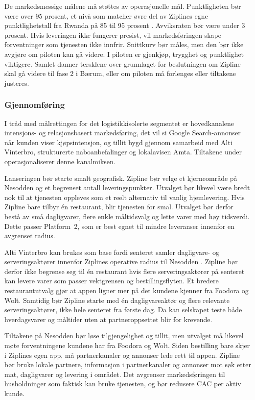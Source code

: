 De markedsmessige målene må støttes av operasjonelle mål. Punktligheten bør
være over 95 prosent, et nivå som matcher øvre del av Ziplines egne
punktlighetstall fra Rwanda på 85 til 95 prosent
\parencite{logisticsnavigators2026}. Avviksraten bør være under 3 prosent.
Hvis leveringen ikke fungerer presist, vil markedsføringen skape
forventninger som tjenesten ikke innfrir. Snittkurv bør måles, men den bør
ikke avgjøre om piloten kan gå videre. I piloten er gjenkjøp, trygghet og
punktlighet viktigere. Samlet danner tersklene over grunnlaget for
beslutningen om Zipline skal gå videre til fase 2 i Bærum, eller om
piloten må forlenges eller tiltakene justeres.

\subsubsection{Gjennomføring}

I tråd med målrettingen for det logistikkisolerte segmentet er
hovedkanalene intensjons- og relasjonsbasert markedsføring, det vil si
Google Search-annonser når kunden viser kjøpsintensjon, og tillit bygd
gjennom samarbeid med Alti Vinterbro, strukturerte naboanbefalinger og
lokalavisen Amta. Tiltakene under operasjonaliserer denne kanalmiksen.

Lanseringen bør starte smalt geografisk. Zipline bør velge et kjerneområde på
Nesodden og et begrenset antall leveringspunkter. Utvalget bør likevel være
bredt nok til at tjenesten oppleves som et reelt alternativ til vanlig
hjemlevering. Hvis Zipline bare tilbyr én restaurant, blir tjenesten for smal.
Utvalget bør derfor bestå av små dagligvarer, flere enkle måltidsvalg og lette
varer med høy tidsverdi. Dette passer Platform~2, som er best egnet til mindre
leveranser innenfor en avgrenset radius.

Alti Vinterbro kan brukes som base fordi senteret samler dagligvare- og
serveringsaktører innenfor Ziplines operative radius til Nesodden
\parencite{altivinterbro}. Zipline bør derfor ikke begrense seg til én
restaurant hvis flere serveringsaktører på senteret kan levere varer som
passer vektgrensen og bestillingsflyten. Et bredere restaurantutvalg gjør at
appen ligner mer på det kundene kjenner fra Foodora og Wolt. Samtidig bør
Zipline starte med én dagligvareaktør og flere relevante serveringsaktører,
ikke hele senteret fra første dag. Da kan selskapet teste både hverdagsvarer
og måltider uten at partneroppsettet blir for krevende.

Tiltakene på Nesodden bør løse tilgjengelighet og tillit, men utvalget må
likevel møte forventningene kundene har fra Foodora og Wolt. Siden bestilling
bare skjer i Ziplines egen app, må partnerkanaler og annonser lede rett til
appen. Zipline bør bruke lokale partnere, informasjon i partnerkanaler og
annonser mot søk etter mat, dagligvarer og levering i området. Det avgrenser
markedsføringen til husholdninger som faktisk kan bruke tjenesten, og bør
redusere CAC per aktiv kunde.

